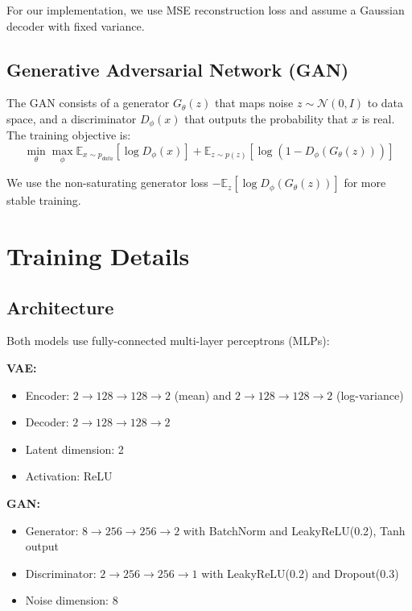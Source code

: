 \documentclass[11pt]{article}
\begin{document}
For our implementation, we use MSE reconstruction loss and assume a Gaussian decoder with fixed variance.

\subsection{Generative Adversarial Network (GAN)}

The GAN consists of a generator $G_\theta(z)$ that maps noise $z \sim \mathcal{N}(0, I)$ to data space, and a discriminator $D_\phi(x)$ that outputs the probability that $x$ is real. The training objective is:
\begin{equation}
    \min_\theta \max_\phi \mathbb{E}_{x \sim p_{data}}[\log D_\phi(x)] + \mathbb{E}_{z \sim p(z)}[\log(1 - D_\phi(G_\theta(z)))]
\end{equation}

We use the non-saturating generator loss $-\mathbb{E}_z[\log D_\phi(G_\theta(z))]$ for more stable training.

\section{Training Details}

\subsection{Architecture}

Both models use fully-connected multi-layer perceptrons (MLPs):

\textbf{VAE:}
\begin{itemize}
    \item Encoder: $2 \to 128 \to 128 \to 2$ (mean) and $2 \to 128 \to 128 \to 2$ (log-variance)
    \item Decoder: $2 \to 128 \to 128 \to 2$
    \item Latent dimension: 2
    \item Activation: ReLU
\end{itemize}

\textbf{GAN:}
\begin{itemize}
    \item Generator: $8 \to 256 \to 256 \to 2$ with BatchNorm and LeakyReLU(0.2), Tanh output
    \item Discriminator: $2 \to 256 \to 256 \to 1$ with LeakyReLU(0.2) and Dropout(0.3)
    \item Noise dimension: 8
\end{itemize}
\end{document}
